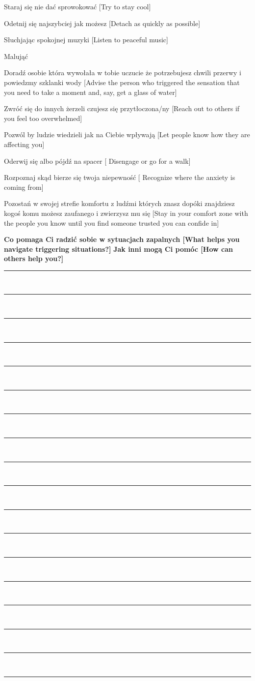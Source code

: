 \begin{checkboxlist}
\item Staraj się nie dać sprowokować [Try to stay cool]
\item Odetnij się najszybciej jak możesz [Detach as quickly as possible]
\item Słuchjając spokojnej muzyki [Listen to peaceful music]
\item Malująć
\item Doradź osobie która wywołała w tobie uczucie że potrzebujesz chwili przerwy i powiedzmy szklanki wody [Advise the person who triggered the sensation that you need to take a moment and, say, get a glass of water]
\item Zwróć się do innych żerzeli czujesz się przytłoczona/ny [Reach out to others if you feel too overwhelmed]
\item Pozwól by ludzie wiedzieli jak na Ciebie wpływają [Let people know how they are affecting you]
\item Oderwij się albo pójdź na spacer [ Disengage or go for a walk]
\item Rozpoznaj skąd bierze się twoja niepewność [ Recognize where the anxiety is coming from]
\item Pozostań w swojej strefie komfortu z ludźmi których znasz dopóki znajdziesz kogoś komu możesz zaufanego i zwierzysz mu się [Stay in your comfort zone with the people you know until you find someone trusted you can confide in]
\end{checkboxlist}

\noindent\textcolor{ProcessBlue}{\textbf{\Large{Co pomaga Ci radzić sobie w sytuacjach zapalnych [What helps you navigate triggering situations?]}}}
\noindent\textcolor{ProcessBlue}{\textbf{\Large{Jak inni mogą Ci pomóc [How can others help you?]}}}\\
\noindent\rule{\textwidth}{1pt}\\
\noindent\rule{\textwidth}{1pt}\\
\noindent\rule{\textwidth}{1pt}\\
\noindent\rule{\textwidth}{1pt}\\
\noindent\rule{\textwidth}{1pt}\\
\noindent\rule{\textwidth}{1pt}\\
\noindent\rule{\textwidth}{1pt}\\
\noindent\rule{\textwidth}{1pt}\\
\noindent\rule{\textwidth}{1pt}\\
\noindent\rule{\textwidth}{1pt}\\
\noindent\rule{\textwidth}{1pt}\\
\noindent\rule{\textwidth}{1pt}\\
\noindent\rule{\textwidth}{1pt}\\
\noindent\rule{\textwidth}{1pt}\\
\noindent\rule{\textwidth}{1pt}\\
\noindent\rule{\textwidth}{1pt}\\
\noindent\rule{\textwidth}{1pt}\\
\noindent\rule{\textwidth}{1pt}\\\
\newpage

